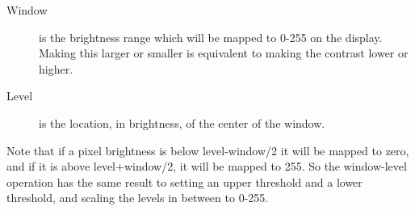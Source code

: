 \documentclass[11pt]{amsart}
\begin{document}
\begin{description}
\item[Window] is the brightness range which will be mapped to 0-255 on the display. Making this larger or smaller is equivalent to making the contrast lower or higher.
\item[Level] is the location, in brightness, of the center of the window. 
\end{description}
 Note that if a pixel brightness is below level-window/2 it will be mapped to zero, and if it is above level+window/2, it will be mapped to 255. So the window-level operation has the same result to setting an upper threshold and a lower threshold, and scaling the levels in between to 0-255.
\end{document}
